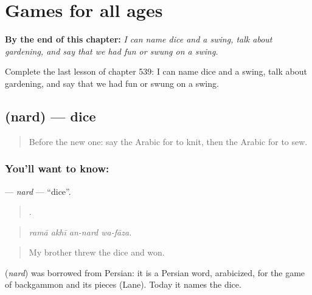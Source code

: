 
\chapter{Games for all ages}
\label{ch:ar-games-for-all-ages}

\begin{chapteropening}
\textbf{By the end of this chapter:} \emph{I can name dice and a swing, talk about gardening, and say that we had fun or swung on a swing.}

Complete the last lesson of chapter 539: I can name dice and a swing, talk about gardening, and say that we had fun or swung on a swing.
\end{chapteropening}

\section[\texorpdfstring{\ar{نرد} (nard)}{نرد (nard)}]{ (nard) — dice}

\label{lesson:AR-C539-nard}



\begin{quote}
Before the new one: say the Arabic for to knit, then the Arabic for to sew.
\end{quote}

\subsection*{You'll want to know: }
\textbf{} — \emph{nard} — \textquotedblleft{}dice\textquotedblright{}.

\begin{quote}
   .
\end{quote}

\begin{quote}
\emph{ramā akhī an-nard wa-fāza.}
\end{quote}

\begin{quote}
My brother threw the dice and won.
\end{quote}

\begin{cousinweb}
\textbf{} (\emph{nard}) was borrowed from Persian: it is a Persian word, arabicized, for the game of backgammon and its pieces (Lane). Today it names the dice.
\end{cousinweb}


